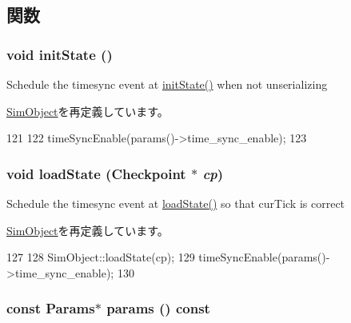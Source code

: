 \subsection{関数}
\hypertarget{classRoot_a3c34ea9b29f410748d4435a667484924}{
\subsubsection[{initState}]{\setlength{\rightskip}{0pt plus 5cm}void initState ()}}
\label{classRoot_a3c34ea9b29f410748d4435a667484924}
Schedule the timesync event at \hyperlink{classRoot_a3c34ea9b29f410748d4435a667484924}{initState()} when not unserializing 

\hyperlink{classSimObject_a3c34ea9b29f410748d4435a667484924}{SimObject}を再定義しています。


\begin{DoxyCode}
121 {
122     timeSyncEnable(params()->time_sync_enable);
123 }
\end{DoxyCode}
\hypertarget{classRoot_a0c3e6eb311ceff72035b11f2a5e0f186}{
\subsubsection[{loadState}]{\setlength{\rightskip}{0pt plus 5cm}void loadState ({\bf Checkpoint} $\ast$ {\em cp})}}
\label{classRoot_a0c3e6eb311ceff72035b11f2a5e0f186}
Schedule the timesync event at \hyperlink{classRoot_a0c3e6eb311ceff72035b11f2a5e0f186}{loadState()} so that curTick is correct 

\hyperlink{classSimObject_a0c3e6eb311ceff72035b11f2a5e0f186}{SimObject}を再定義しています。


\begin{DoxyCode}
127 {
128     SimObject::loadState(cp);
129     timeSyncEnable(params()->time_sync_enable);
130 }
\end{DoxyCode}
\hypertarget{classRoot_acd3c3feb78ae7a8f88fe0f110a718dff}{
\subsubsection[{params}]{\setlength{\rightskip}{0pt plus 5cm}const {\bf Params}$\ast$ params () const}}
\label{classRoot_acd3c3feb78ae7a8f88fe0f110a718dff}



